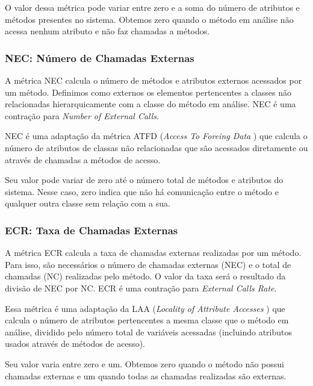 	O valor dessa métrica pode variar entre zero e a soma do número de atributos e métodos presentes no sistema. Obtemos zero quando o método em análise não acessa nenhum atributo e não faz chamadas a métodos.
	

\subsubsection{NEC: Número de Chamadas Externas}

	A métrica NEC calcula o número de métodos e atributos externos acessados por um método. Definimos como externos os elementos pertencentes a classes não relacionadas hierarquicamente com a classe do método em análise. NEC é uma contração para \textit{Number of External Calls}.
	                                               
	NEC é uma adaptação da métrica ATFD (\textit{Access To Foreing Data} \citep{Marinescu02}) que calcula o número de atributos de classas não relacionadas que são acessados diretamente ou através de chamadas a métodos de acesso. 
	
	Seu valor pode variar de zero até o número total de métodos e atributos do sistema. Nesse caso, zero indica que não há comunicação entre o método e qualquer outra classe sem relação com a sua.
	
                          

\subsubsection{ECR: Taxa de Chamadas Externas}
                                         
	A métrica ECR calcula a taxa de chamadas externas realizadas por um método. Para isso, são necessários o número de chamadas externas (NEC) e o total de chamadas (NC) realizadas pelo método. O valor da taxa será o resultado da divisão de NEC por NC. ECR é uma contração para \textit{External Calls Rate}.
	
	Essa métrica é uma adaptação da LAA (\textit{Locality of Attribute Accesses} \citep{Lanza06}) que calcula o número de atributos pertencentes a mesma classe que o método em análise, dividido pelo número total de variáveis acessadas (incluindo atributos usados através de métodos de acesso). 
	
	Seu valor varia entre zero e um. Obtemos zero quando o método não possui chamadas externas e um quando todas as chamadas realizadas são externas.
	
